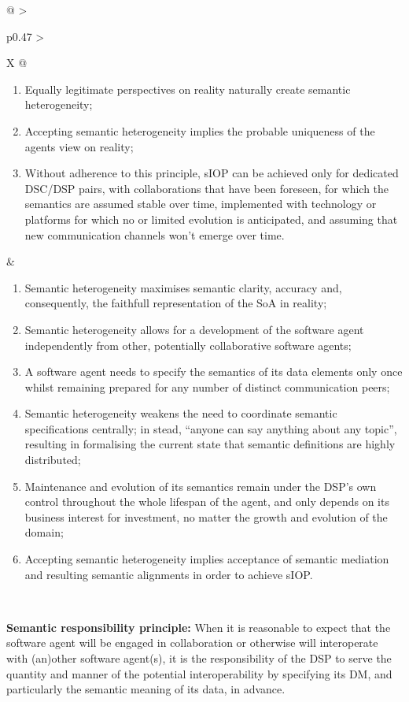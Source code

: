 \begin{xltabular}[l]{\linewidth}{@{} >{\small\raggedright\arraybackslash}p{0.47\linewidth} >{\small\raggedright\arraybackslash}X @{}}
\begin{enumerate}[left=6pt, nosep]
  \item Equally legitimate perspectives on reality naturally create semantic heterogeneity;
  \item Accepting semantic heterogeneity implies the probable uniqueness of the agents view on reality;
  \item Without adherence to this principle, sIOP can be achieved only for dedicated DSC/DSP pairs, with collaborations that have been foreseen, for which the semantics are assumed stable over time, implemented with technology or platforms for which no or limited evolution is anticipated, and assuming that new communication channels won’t emerge over time.
\end{enumerate}
&
\begin{enumerate}[left=10pt, nosep]
  \item Semantic heterogeneity maximises semantic clarity, accuracy and, consequently, the faithfull representation of the SoA in reality;
  \item Semantic heterogeneity allows for a development of the software agent independently from other, potentially collaborative software agents;
  \item A software agent needs to specify the semantics of its data elements only once whilst remaining prepared for any number of distinct communication peers;
  \item Semantic heterogeneity weakens the need to coordinate semantic specifications centrally; in stead, “anyone can say anything about any topic”, resulting in formalising the current state that semantic definitions are highly distributed;
  \item Maintenance and evolution of its semantics remain under the DSP’s own control throughout the whole lifespan of the agent, and only depends on its business interest for investment, no matter the growth and evolution of the domain;
  \item Accepting semantic heterogeneity implies acceptance of semantic mediation and resulting semantic alignments in order to achieve sIOP.
\end{enumerate} \\
%
%
%
\begin{mmdp}\label{dp:rfsm}{\bfseries Semantic responsibility principle:}
\quad When it is reasonable to expect that the software agent will be engaged in collaboration or otherwise will interoperate with (an)other software agent(s), it is the responsibility of the DSP to serve the quantity and manner of the potential interoperability by specifying its DM, and particularly the semantic meaning of its data, in advance.

\end{mmdp}
\end{xltabular}
